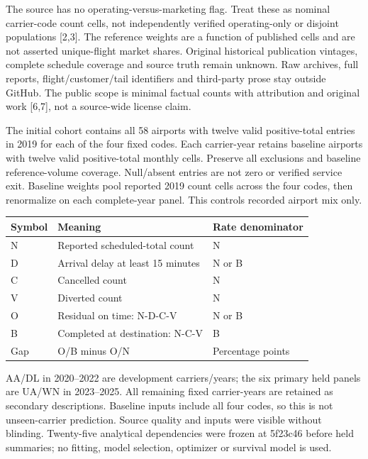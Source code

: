 \documentclass[11pt]{article}
\begin{document}
The source has no operating-versus-marketing flag. Treat these as nominal carrier-code count cells, not independently verified operating-only or disjoint populations [2,3]. The reference weights are a function of published cells and are not asserted unique-flight market shares. Original historical publication vintages, complete schedule coverage and source truth remain unknown. Raw archives, full reports, flight/customer/tail identifiers and third-party prose stay outside GitHub. The public scope is minimal factual counts with attribution and original work [6,7], not a source-wide license claim.

The initial cohort contains all 58 airports with twelve valid positive-total entries in 2019 for each of the four fixed codes. Each carrier-year retains baseline airports with twelve valid positive-total monthly cells. Preserve all exclusions and baseline reference-volume coverage. Null/absent entries are not zero or verified service exit. Baseline weights pool reported 2019 count cells across the four codes, then renormalize on each complete-year panel. This controls recorded airport mix only.

\begin{center}\small\setlength{\tabcolsep}{4pt}
\begin{tabular}{lll}\toprule
Symbol & Meaning & Rate denominator \\
\midrule
N & Reported scheduled-total count & N \\
D & Arrival delay at least 15 minutes & N or B \\
C & Cancelled count & N \\
V & Diverted count & N \\
O & Residual on time: N-D-C-V & N or B \\
B & Completed at destination: N-C-V & B \\
Gap & O/B minus O/N & Percentage points \\
\bottomrule\end{tabular}\end{center}
AA/DL in 2020--2022 are development carriers/years; the six primary held panels are UA/WN in 2023--2025. All remaining fixed carrier-years are retained as secondary descriptions. Baseline inputs include all four codes, so this is not unseen-carrier prediction. Source quality and inputs were visible without blinding. Twenty-five analytical dependencies were frozen at 5f23c46 before held summaries; no fitting, model selection, optimizer or survival model is used.
\end{document}
